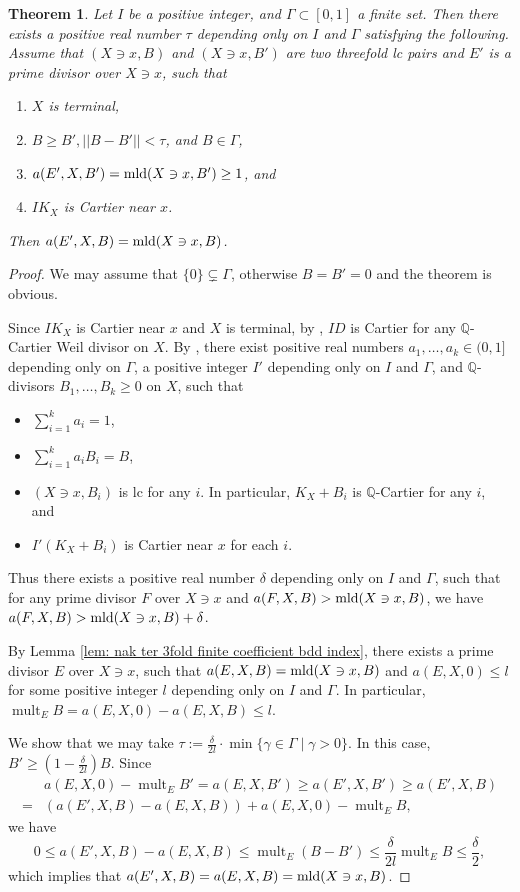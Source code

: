\documentclass[11pt]{amsart}
\numberwithin{equation}{section}
\newcommand{\Qq}{\mathbb{Q}}
\newcommand{\mld}{{\rm{mld}}}
\newcommand{\mult}{\operatorname{mult}}
\newcommand{\Ii}{{\Gamma}}
\newtheorem{thm}{Theorem}[section]
\theoremstyle{definition}
\theoremstyle{definition}
\begin{document}
\begin{thm}\label{thm: divisors compouting mlds}
Let $I$ be a positive integer, and $\Ii\subset [0,1]$ a finite set. Then there exists a positive real number $\tau$ depending only on $I$ and $\Ii$ satisfying the following. Assume that $(X\ni x,B)$ and $(X\ni x,B')$ are two threefold lc pairs and $E'$ is a prime divisor over $X\ni x$, such that
	\begin{enumerate}
	\item $X$ is terminal,
	\item $B\geq B',||B-B'||<\tau$, and $B\in\Ii$, 
	\item $a(E',X,B')=\mld(X\ni x,B')\geq 1$, and
	\item $IK_X$ is Cartier near $x$.
	\end{enumerate}
Then $a(E',X,B)=\mld(X\ni x,B)$.
\end{thm}
\begin{proof}
We may assume that $\{0\}\subsetneq \Ii$, otherwise $B=B'=0$ and the theorem is obvious. 

Since $IK_X$ is Cartier near $x$ and $X$ is terminal, by \cite[Lemma~5.1]{Kaw88}, $ID$ is Cartier for any $\Qq$-Cartier Weil divisor on $X$. By \cite[Theorem 5.6]{HLS19}, there exist positive real numbers $a_1,\dots,a_k\in (0,1]$ depending only on $\Ii$, a positive integer $I'$ depending only on $I$ and $\Ii$, and $\Qq$-divisors $B_1,\dots,B_k\geq 0$ on $X$, such that
\begin{itemize}
\item $\sum_{i=1}^ka_i=1$,
\item $\sum_{i=1}^ka_iB_i=B$, 
\item $(X\ni x,B_i)$ is lc for any $i$. In particular, $K_X+B_i$ is $\Qq$-Cartier for any $i$, and
\item $I'(K_X+B_i)$ is Cartier near $x$ for each $i$.
\end{itemize}
Thus there exists a positive real number $\delta$ depending only on $I$ and $\Ii$, such that for any prime divisor $F$ over $X\ni x$ and $a(F,X,B)>\mld(X\ni x,B)$, we have $a(F,X,B)>\mld(X\ni x,B)+\delta$.

By Lemma \ref{lem: nak ter 3fold finite coefficient bdd index}, there exists a prime divisor $E$ over $X\ni x$, such that $a(E,X,B)=\mld(X\ni x,B)$ and $a(E,X,0)\leq l$ for some positive integer $l$ depending only on $I$ and $\Ii$. In particular, $\mult_E B=a(E,X,0)-a(E,X,B)\le l$.

We show that we may take $\tau:=\frac{\delta}{2l}\cdot\min\{\gamma\in\Ii\mid \gamma>0\}$. In this case, $B'\geq (1-\frac{\delta}{2l})B$. Since
\begin{align*}
    &a(E,X,0)-\mult_EB'=a(E,X,B')\geq a(E',X,B')\geq a(E',X,B)\\
    =&(a(E',X,B)-a(E,X,B))+a(E,X,0)-\mult_E B,
\end{align*}
we have
$$0\leq a(E',X,B)-a(E,X,B)\leq \mult_E(B-B')\leq\frac{\delta}{2l}\mult_E B\le \frac{\delta}{2},$$
which implies that $a(E',X,B)=a(E,X,B)=\mld(X\ni x,B)$.
\end{proof}
\end{document}
